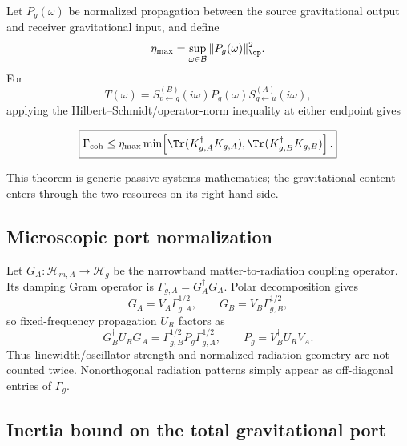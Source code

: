 Let $P_g(\omega)$ be normalized propagation between the source gravitational output and receiver gravitational input, and define
\begin{equation}
\eta_{\max}
=\sup_{\omega\in\mathcal B}\|P_g(\omega)\|_{\op}^2.
\label{eq:etamax}
\end{equation}
For
\begin{equation}
T(\omega)=S_{v\leftarrow g}^{(B)}(i\omega)
P_g(\omega)S_{g\leftarrow u}^{(A)}(i\omega),
\label{eq:fullT}
\end{equation}
applying the Hilbert--Schmidt/operator-norm inequality at either endpoint gives
\begin{theorem}
\begin{equation}
\boxed{
\Gamma_{\rm coh}
\le
\eta_{\max}
\min\!\left[
\Tr(K_{g,A}^\dagger K_{g,A}),
\Tr(K_{g,B}^\dagger K_{g,B})
\right].}
\label{eq:cutset}
\end{equation}
\end{theorem}
This theorem is generic passive systems mathematics; the gravitational content enters through the two resources on its right-hand side.

\subsection{Microscopic port normalization}

Let $G_A:\mathcal H_{m,A}\to\mathcal H_g$ be the narrowband matter-to-radiation coupling operator. Its damping Gram operator is $\Gamma_{g,A}=G_A^\dagger G_A$. Polar decomposition gives
\begin{equation}
G_A=V_A\Gamma_{g,A}^{1/2},
\qquad
G_B=V_B\Gamma_{g,B}^{1/2},
\label{eq:polar}
\end{equation}
so fixed-frequency propagation $U_R$ factors as
\begin{equation}
\boxed{
G_B^\dagger U_RG_A
=\Gamma_{g,B}^{1/2}P_g\Gamma_{g,A}^{1/2},
\qquad P_g=V_B^\dagger U_RV_A.}
\label{eq:microscopicfactor}
\end{equation}
Thus linewidth/oscillator strength and normalized radiation geometry are not counted twice. Nonorthogonal radiation patterns simply appear as off-diagonal entries of $\Gamma_g$.

\subsection{Inertia bound on the total gravitational port}

